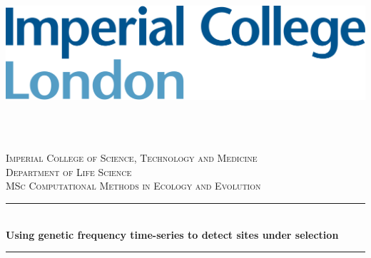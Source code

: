 \documentclass[12pt]{article}
\begin{document}
\begin{titlepage}

\newcommand{\HRule}{\rule{\linewidth}{0.5mm}} %
\setlength{\topmargin}{0in}
\center %
 
 
 \begin{minipage}{0.4\textwidth}
\begin{flushleft} \large
\hspace*{-0.5cm}
\includegraphics[scale=0.14]{figures/imperial.png}\\
\end{flushleft}
\end{minipage}
~
\begin{minipage}{0.5\textwidth}
\begin{flushright} \large
\hspace*{2cm}
\end{flushright}
\end{minipage}\\[1cm]

\textsc{\LARGE Imperial College of Science, Technology and Medicine}\\[1.2cm] %
\textsc{\Large Department of Life Science}\\[0.4cm] %
\textsc{\large MSc Computational Methods in Ecology and Evolution}\\[0.4cm] %


\HRule \\[0.4cm]
{ \huge \bfseries Using genetic frequency time-series to detect sites under selection}\\[0.4cm] %
\HRule \\[0.4cm]
 

\end{titlepage}
\end{document}
